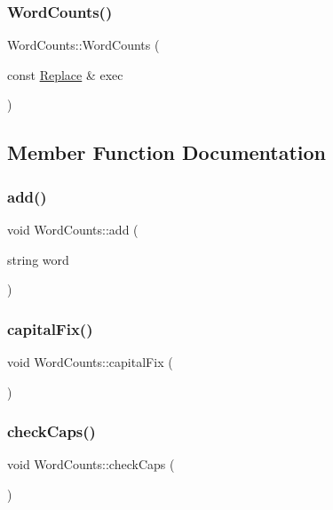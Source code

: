 \subsubsection{\texorpdfstring{Word\+Counts()}{WordCounts()}}
{\footnotesize\ttfamily Word\+Counts\+::\+Word\+Counts (\begin{DoxyParamCaption}\item[{const \hyperlink{class_replace}{Replace} \&}]{exec }\end{DoxyParamCaption})\hspace{0.3cm}{\ttfamily [inline]}}



\subsection{Member Function Documentation}
\mbox{\label{class_word_counts_adbf0439b0c4b121316417c8f57a2c59e}} 
\subsubsection{\texorpdfstring{add()}{add()}}
{\footnotesize\ttfamily void Word\+Counts\+::add (\begin{DoxyParamCaption}\item[{string}]{word }\end{DoxyParamCaption})}

\mbox{\label{class_word_counts_a755bf8c6d952149447d0b7ee85b08106}} 
\subsubsection{\texorpdfstring{capital\+Fix()}{capitalFix()}}
{\footnotesize\ttfamily void Word\+Counts\+::capital\+Fix (\begin{DoxyParamCaption}{ }\end{DoxyParamCaption})}

\mbox{\label{class_word_counts_a224e6e76ffa6a20b0cb38fbc4ecf1954}} 
\subsubsection{\texorpdfstring{check\+Caps()}{checkCaps()}}
{\footnotesize\ttfamily void Word\+Counts\+::check\+Caps (\begin{DoxyParamCaption}{ }\end{DoxyParamCaption})}

